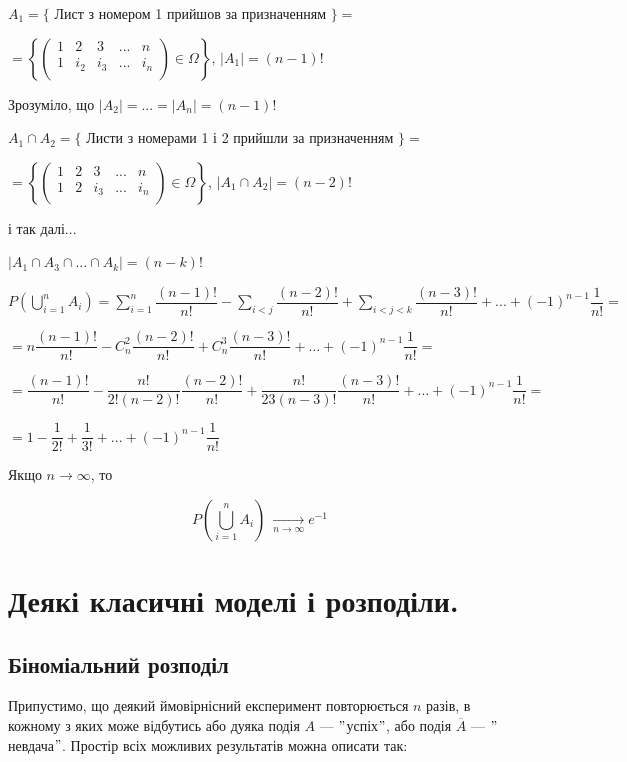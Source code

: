 $A_1 = \{$ Лист з номером 1 прийшов за призначенням $\} =$

$= \left\{\begin{pmatrix}
    1 & 2 & 3 & ... & n\\
    1 & i_2 & i_3 & ... & i_n \\
\end{pmatrix} \in \Omega \right\}$, $|A_1| = (n-1)!$

Зрозуміло, що $|A_2| = ... = |A_n| = (n-1)!$

$A_1 \cap A_2 = \{$ Листи з номерами 1 і 2 прийшли за призначенням $\} =$

$= \left\{\begin{pmatrix}
    1 & 2 & 3 & ... & n\\
    1 & 2 & i_3 & ... & i_n \\
\end{pmatrix} \in \Omega \right\}$, $|A_1 \cap A_2| = (n-2)!$

і так далі...

$|A_1 \cap A_3 \cap ... \cap A_k| = (n-k)!$

$P\left(\bigcup\limits_{i=1}^n A_i\right)
= \sum\limits_{i=1}^n \dfrac{(n-1)!}{n!}
    - \sum\limits_{i<j} \dfrac{(n-2)!}{n!}
    + \sum\limits_{i<j<k} \dfrac{(n-3)!}{n!}
    + ...
    + (-1)^{n-1} \dfrac{1}{n!} =$

$= n \dfrac{(n-1)!}{n!}
    - C_n^2 \dfrac{(n-2)!}{n!}
    + C_n^3 \dfrac{(n-3)!}{n!}
    + ... 
    + (-1)^{n-1} \dfrac{1}{n!} =$

$= \dfrac{(n-1)!}{n!}
    - \dfrac{n!}{2!(n-2)!} \dfrac{(n-2)!}{n!}
    + \dfrac{n!}{23(n-3)!} \dfrac{(n-3)!}{n!}
    + ... 
    + (-1)^{n-1} \dfrac{1}{n!} =$

$= 1
    - \dfrac{1}{2!}
    + \dfrac{1}{3!}
    + ... 
    + (-1)^{n-1} \dfrac{1}{n!}$

Якщо $n \rightarrow \infty$, то
 
$$P\left(\bigcup\limits_{i=1}^n A_i\right) \ \xrightarrow[n \rightarrow \infty]{} e ^{-1}$$

\section{Деякі класичні моделі і розподіли.}

\subsection{Біноміальний розподіл}

Припустимо, що деякий ймовірнісний експеримент повторюється $n$ разів, в
кожному з яких може відбутись або дуяка подія $A$ --- $"$успіх$"$, або подія
$\overline{A}$ --- $"$невдача$"$. Простір всіх можливих результатів можна
описати так:

